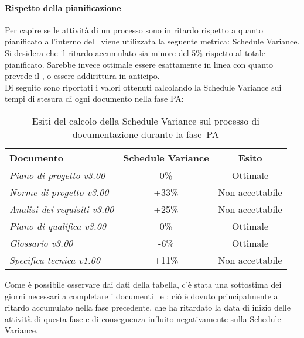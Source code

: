 \documentclass[../PianoDiQualifica.tex]{subfiles}
\begin{document}
\begin{appendices}
			\paragraph{Rispetto della pianificazione}
			Per capire se le attività di un processo sono in ritardo rispetto a quanto pianificato all'interno del \pianodiprogetto\ viene utilizzata la seguente metrica: Schedule Variance.\\
			Si desidera che il ritardo accumulato sia minore del 5\% rispetto al totale pianificato. Sarebbe invece ottimale essere esattamente in linea con quanto prevede il \pianodiprogetto, o essere addirittura in anticipo.\\
			Di seguito sono riportati i valori ottenuti calcolando la Schedule Variance sui tempi di stesura di ogni documento nella fase PA:
			\begin{table}[H]
				\centering
				\begin{tabular}{l * {2}{c}}
					\toprule
					\textbf{Documento} & \textbf{Schedule Variance} & \textbf{Esito} \\
					\midrule
					\textit{Piano di progetto v3.00} & 0\% &  Ottimale \\
					\textit{Norme di progetto v3.00} & +33\% & Non accettabile \\
					\textit{Analisi dei requisiti v3.00} & +25\% & Non accettabile \\
					\textit{Piano di qualifica v3.00} & 0\% & Ottimale \\
					\textit{Glossario v3.00} & -6\% & Ottimale \\
					\textit{Specifica tecnica v1.00} & +11\% & Non accettabile \\
					\bottomrule
				\end{tabular}
				\caption{Esiti del calcolo della Schedule Variance sul processo di documentazione durante la fase\g\ PA}
				Come è possibile osservare dai dati della tabella, c'è stata una sottostima dei giorni necessari a completare i documenti \normediprogetto\ e \analisideirequisiti: ciò è dovuto principalmente al ritardo accumulato nella fase precedente, che ha ritardato la data di inizio delle attività di questa fase e di conseguenza influito negativamente sulla Schedule Variance.
				\label{tab:esiti_schedule_variance}
			\end{table}
			

\end{appendices}
\end{document}
